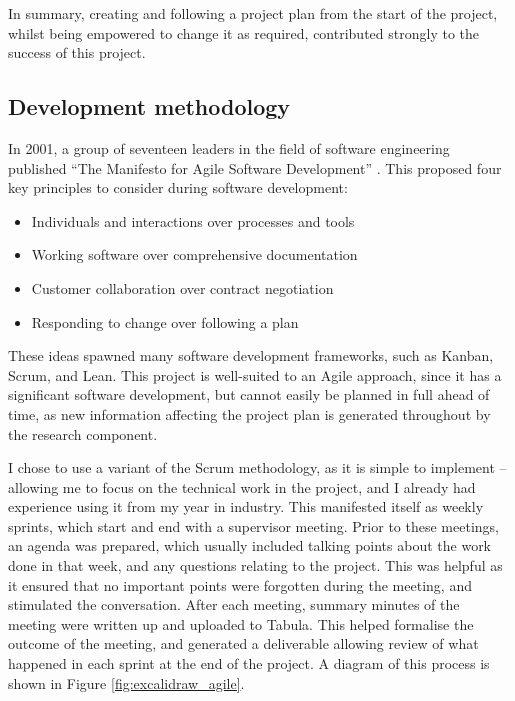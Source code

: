 
In summary, creating and following a project plan from the start of the project, whilst being empowered to change it as required, contributed strongly to the success of this project.

\subsection{Development methodology}
\label{ssec:organisation-methodology}

In 2001, a group of seventeen leaders in the field of software engineering published ``The Manifesto for Agile Software Development'' \cite{beckManifestoAgileSoftware2001}. This proposed four key principles to consider during software development:

\begin{itemize}
    \item Individuals and interactions over processes and tools
    \item Working software over comprehensive documentation
    \item Customer collaboration over contract negotiation
    \item Responding to change over following a plan
\end{itemize}

These ideas spawned many software development frameworks, such as Kanban, Scrum, and Lean. This project is well-suited to an Agile approach, since it has a significant software development, but cannot easily be planned in full ahead of time, as new information affecting the project plan is generated throughout by the research component.

I chose to use a variant of the Scrum methodology, as it is simple to implement -- allowing me to focus on the technical work in the project, and I already had experience using it from my year in industry. This manifested itself as weekly sprints, which start and end with a supervisor meeting. Prior to these meetings, an agenda was prepared, which usually included talking points about the work done in that week, and any questions relating to the project. This was helpful as it ensured that no important points were forgotten during the meeting, and stimulated the conversation. After each meeting, summary minutes of the meeting were written up and uploaded to Tabula. This helped formalise the outcome of the meeting, and generated a deliverable allowing review of what happened in each sprint at the end of the project. A diagram of this process is shown in Figure \ref{fig:excalidraw_agile}.

